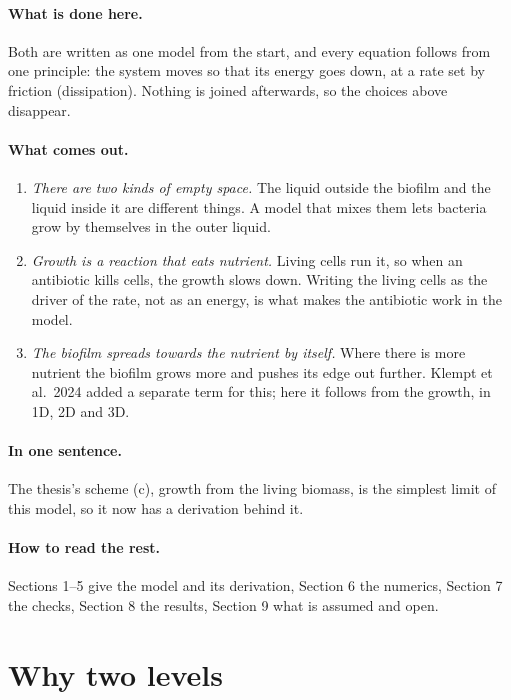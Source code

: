 \documentclass[11pt,a4paper]{article}
\begin{document}
\paragraph{What is done here.} Both are written as one model from the start, and every
equation follows from one principle: the system moves so that its energy goes down, at a rate
set by friction (dissipation). Nothing is joined afterwards, so the choices above disappear.

\paragraph{What comes out.}
\begin{enumerate}
\item \emph{There are two kinds of empty space.} The liquid outside the biofilm and the liquid
  inside it are different things. A model that mixes them lets bacteria grow by themselves in
  the outer liquid.
\item \emph{Growth is a reaction that eats nutrient.} Living cells run it, so when an antibiotic
  kills cells, the growth slows down. Writing the living cells as the driver of the rate, not as
  an energy, is what makes the antibiotic work in the model.
\item \emph{The biofilm spreads towards the nutrient by itself.} Where there is more nutrient
  the biofilm grows more and pushes its edge out further. Klempt et al.\ 2024 added a separate
  term for this; here it follows from the growth, in 1D, 2D and 3D.
\end{enumerate}

\paragraph{In one sentence.} The thesis's scheme (c), growth from the living biomass, is the
simplest limit of this model, so it now has a derivation behind it.

\paragraph{How to read the rest.} Sections 1--5 give the model and its derivation, Section 6
the numerics, Section 7 the checks, Section 8 the results, Section 9 what is assumed and open.

\section{Why two levels}
\label{sec:two}
\end{document}
